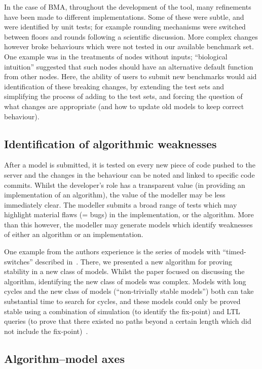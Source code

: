 \documentclass{llncs}
\begin{document}
In the case of BMA, throughout the development of the tool, many
refinements have been made to different implementations. Some of these
were subtle, and were identified by unit tests; for example rounding
mechanisms were switched between floors and rounds following a
scientific discussion. More complex changes however broke behaviours
which were not tested in our available benchmark set. One example was
in the treatments of nodes without inputs; ``biological intuition''
suggested that such nodes should have an alternative default function
from other nodes. Here, the ability of users to submit new benchmarks
would aid identification of these breaking changes, by extending the
test sets and simplifying the process of adding to the test sets, and
forcing the question of what changes are appropriate (and how to
update old models to keep correct behaviour).


\subsection{Identification of algorithmic weaknesses}

After a model is submitted, it is tested on every new piece of code
pushed to the server and the changes in the behaviour can be noted and
linked to specific code commits. Whilst the developer's role has a
transparent value (in providing an implementation of an algorithm),
the value of the modeller may be less immediately clear. The modeller
submits a broad range of tests which may highlight material flaws
(= bugs) in the implementation, or the algorithm. More than this
however, the modeller may generate models which identify weaknesses of
either an algorithm or an implementation.

One example from the authors experience is the series of models with
``timed-switches'' described in~\cite{cook-et-al:2014}. There, we presented a
new algorithm for proving stability in a new class of models. Whilst
the paper focused on discussing the algorithm, identifying the new
class of models was complex. Models with long cycles and the new class
of models (``non-trivially stable models'') both can take substantial
time to search for cycles, and these models could only be proved
stable using a combination of simulation (to identify the fix-point)
and LTL queries (to prove that there existed no paths beyond a certain
length which did not include the fix-point)~\cite{piterman2013}.

\subsection{Algorithm--model axes}
\end{document}
